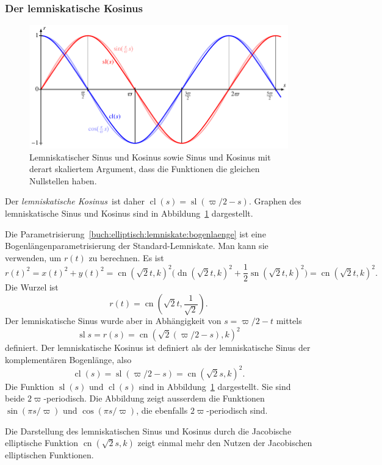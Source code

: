 \subsubsection{Der lemniskatische Kosinus}
\begin{figure}
\centering
\includegraphics[width=\textwidth]{chapters/110-elliptisch/images/slcl.pdf}
\caption{
Lemniskatischer Sinus und Kosinus sowie Sinus und Kosinus
mit derart skaliertem Argument, dass die Funktionen die
gleichen Nullstellen haben.
\label{buch:elliptisch:figure:slcl}}
\end{figure}
Der {\em lemniskatische Kosinus} ist daher
$\operatorname{cl}(s) = \operatorname{sl}(\varpi/2-s)$.
Graphen des lemniskatische Sinus und Kosinus sind in
Abbildung~\ref{buch:elliptisch:figure:slcl} dargestellt.

Die Parametrisierung~\eqref{buch:elliptisch:lemniskate:bogenlaenge}
ist eine Bogenlängenparametrisierung der Standard-Lemniskate.
Man kann sie verwenden, um $r(t)$ zu berechnen.
Es ist
\[
r(t)^2
=
x(t)^2 + y(t)^2
=
\operatorname{cn}(\!\sqrt{2}t,k)^2
\biggl(
\operatorname{dn}(\!\sqrt{2}t,k)^2
+
\frac12
\operatorname{sn}(\!\sqrt{2}t,k)^2
\biggr)
=
\operatorname{cn}(\!\sqrt{2}t,k)^2.
\]
Die Wurzel ist
\[
r(t)
=
\operatorname{cn}(\!\sqrt{2}t,{\textstyle\frac{1}{\!\sqrt{2}}})
.
\]
Der lemniskatische Sinus wurde aber in Abhängigkeit von
$s=\varpi/2-t$ mittels
\[
\operatorname{sl}s
=
r(s)
=
\operatorname{cn}(\!\sqrt{2}(\varpi/2-s),k)^2
\]
definiert.
Der lemniskatische Kosinus ist definiert als der lemniskatische Sinus
%
%
der komplementären Bogenlänge, also
\[
\operatorname{cl}(s)
=
\operatorname{sl}(\varpi/2-s)
=
\operatorname{cn}(\!\sqrt{2}s,k)^2.
\]
Die Funktion $\operatorname{sl}(s)$ und $\operatorname{cl}(s)$ sind
in Abbildung~\ref{buch:elliptisch:figure:slcl} dargestellt.
Sie sind beide $2\varpi$-periodisch.
Die Abbildung zeigt ausserdem die Funktionen $\sin (\pi s/\varpi)$
und $\cos(\pi s/\varpi)$, die ebenfalls $2\varpi$-periodisch sind.

Die Darstellung des lemniskatischen Sinus und Kosinus durch die
Jacobische elliptische Funktion $\operatorname{cn}(\!\sqrt{2}s,k)$
zeigt einmal mehr den Nutzen der Jacobischen elliptischen Funktionen.




